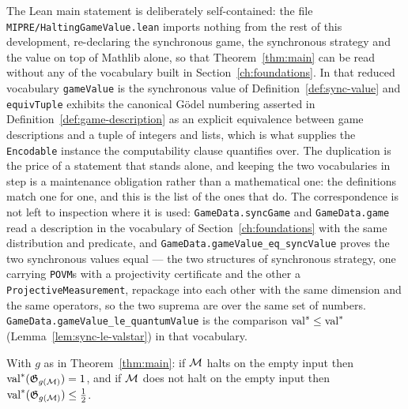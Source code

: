 \begin{remark}
\label{rem:standalone-restatement}
\leanok
The Lean main statement is deliberately self-contained: the file
\texttt{MIPRE/HaltingGameValue.lean} imports nothing from the rest of this development,
re-declaring the synchronous game, the synchronous strategy and the value on top of
Mathlib alone, so that Theorem~\ref{thm:main} can be read without any of the vocabulary
built in Section~\ref{ch:foundations}. In that reduced vocabulary \texttt{gameValue} is
the synchronous value of Definition~\ref{def:sync-value} and \texttt{equivTuple}
exhibits the canonical G\"odel numbering asserted in
Definition~\ref{def:game-description} as an explicit equivalence between game
descriptions and a tuple of integers and lists, which is what supplies the
\texttt{Encodable} instance the computability clause quantifies over. The duplication is
the price of a statement that stands alone, and keeping the two vocabularies in step is a
maintenance obligation rather than a mathematical one: the definitions match one for one,
and this is the list of the ones that do. The correspondence is not left to inspection where
it is used: \texttt{GameData.syncGame} and \texttt{GameData.game} read a description in the
vocabulary of Section~\ref{ch:foundations} with the same distribution and predicate, and
\texttt{GameData.gameValue\_eq\_syncValue} proves the two synchronous values equal --- the
two structures of synchronous strategy, one carrying \texttt{POVM}s with a projectivity
certificate and the other a \texttt{ProjectiveMeasurement}, repackage into each other with
the same dimension and the same operators, so the two suprema are over the same set of
numbers. \texttt{GameData.gameValue\_le\_quantumValue} is the comparison
$\mathrm{val}^{s} \leq \mathrm{val}^*$ (Lemma~\ref{lem:sync-le-valstar}) in that vocabulary.
\end{remark}

\begin{corollary}
\label{cor:main-quantum}
\leanok
With $g$ as in Theorem~\ref{thm:main}: if $\mathcal{M}$ halts on the empty input then
$\mathrm{val}^*(\mathfrak{G}_{g(\mathcal{M})}) = 1$, and if $\mathcal{M}$ does not halt on the empty input
then $\mathrm{val}^*(\mathfrak{G}_{g(\mathcal{M})}) \leq \tfrac12$.
\end{corollary}

